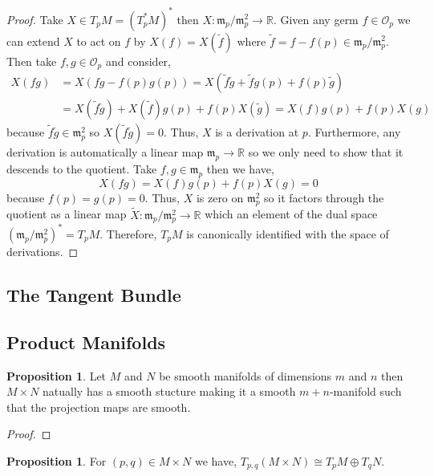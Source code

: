 \documentclass[12pt]{extarticle}
\newcommand{\R}{\mathbb{R}}
\theoremstyle{definition}
\newtheorem{proposition}[theorem]{Proposition}
\renewcommand{\O}{\mathcal{O}}
\newcommand{\m}{\mathfrak{m}}
\begin{document}
\begin{proof}
Take $X \in T_p M = (T_p^* M)^*$ then $X : \m_p / \m_p^2 \to \R$. Given any germ $f \in \O_p$ we can extend $X$ to act on $f$ by $X(f) = X(\tilde{f})$ where $\tilde{f} = f - f(p) \in \m_p / \m_p^2$. Then take $f, g \in \O_p$ and consider,
\begin{align*}
X(fg) & = X(fg - f(p) g(p)) = X(\tilde{f} \tilde{g} + \tilde{f} g(p) + f(p) \tilde{g})
\\
& = X(\tilde{f} \tilde{g}) + X(\tilde{f}) g(p) + f(p) X(\tilde{g}) = X(f) g(p) + f(p) X(g) 
\end{align*}
because $\tilde{f} \tilde{g} \in \m_p^2$ so $X(\tilde{f} \tilde{g}) = 0$. Thus, $X$ is a derivation at $p$. Furthermore, any derivation is automatically a linear map $\m_p \to \R$ so we only need to show that it descends to the quotient. Take $f, g \in \m_p$ then we have,
\[ X(fg) = X(f) g(p) + f(p) X(g) = 0 \] 
because $f(p) = g(p) = 0$. Thus, $X$ is zero on $\m_p^2$ so it factors through the quotient as a linear map $\tilde{X} : \m_p / \m_p^2 \to \R$ which an element of the dual space $(\m_p / \m_p^2)^* = T_p M$. Therefore, $T_p M$ is canonically identified with the space of derivations. 
\end{proof}

\subsection{The Tangent Bundle}

\subsection{Product Manifolds}

\begin{proposition}
Let $M$ and $N$ be smooth manifolds of dimensions $m$ and $n$ then $M \times N$ natually has a smooth stucture making it a smooth $m + n$-manifold such that the projection maps are smooth. 
\end{proposition}

\begin{proof}

\end{proof}

\begin{proposition}
For $(p,q) \in M \times N$ we have, $T_{p,q} (M \times N) \cong T_p M \oplus T_q N$.
\end{proposition}
\end{document}
